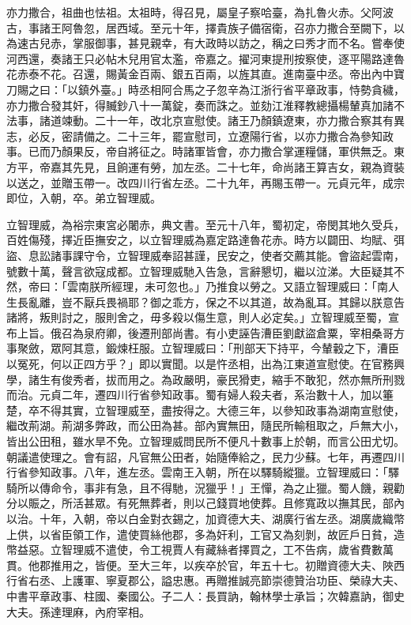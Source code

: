 \begin{pinyinscope}
 亦力撒合，祖曲也怯祖。太祖時，得召見，屬皇子察哈臺，為扎魯火赤。父阿波古，事諸王阿魯忽，居西域。至元十年，擇貴族子備宿衛，召亦力撒合至闕下，以為速古兒赤，掌服御事，甚見親幸，有大政時以訪之，稱之曰秀才而不名。嘗奉使河西還，奏諸王只必帖木兒用官太濫，帝嘉之。擢河東提刑按察使，逐平陽路達魯花赤泰不花。召還，賜黃金百兩、銀五百兩，以旌其直。進南臺中丞。帝出內中寶刀賜之曰：「以鎮外臺。」時丞相阿合馬之子忽辛為江浙行省平章政事，恃勢貪穢，亦力撒合發其奸，得贓鈔八十一萬錠，奏而誅之。並劾江淮釋教總攝楊輦真加諸不法事，諸道竦動。二十一年，改北京宣慰使。諸王乃顏鎮遼東，亦力撒合察其有異志，必反，密請備之。二十三年，罷宣慰司，立遼陽行省，以亦力撒合為參知政事。已而乃顏果反，帝自將征之。時諸軍皆會，亦力撒合掌運糧儲，軍供無乏。東方平，帝嘉其先見，且餉運有勞，加左丞。二十七年，命尚諸王算吉女，親為資裝以送之，並贈玉帶一。改四川行省左丞。二十九年，再賜玉帶一。元貞元年，成宗即位，入朝，卒。弟立智理威。



 立智理威，為裕宗東宮必闍赤，典文書。至元十八年，蜀初定，帝閔其地久受兵，百姓傷殘，擇近臣撫安之，以立智理威為嘉定路達魯花赤。時方以闢田、均賦、弭盜、息訟諸事課守令，立智理威奉詔甚謹，民安之，使者交薦其能。會盜起雲南，號數十萬，聲言欲寇成都。立智理威馳入告急，言辭懇切，繼以泣涕。大臣疑其不然，帝曰：「雲南朕所經理，未可忽也。」乃推食以勞之。又語立智理威曰：「南人生長亂離，豈不厭兵畏禍耶？御之乖方，保之不以其道，故為亂耳。其歸以朕意告諸將，叛則討之，服則舍之，毋多殺以傷生意，則人必定矣。」立智理威至蜀，宣布上旨。俄召為泉府卿，後遷刑部尚書。有小吏誣告漕臣劉獻盜倉粟，宰相桑哥方事聚斂，眾阿其意，鍛煉枉服。立智理威曰：「刑部天下持平，今輦轂之下，漕臣以冤死，何以正四方乎？」即以實聞。以是忤丞相，出為江東道宣慰使。在官務興學，諸生有俊秀者，拔而用之。為政嚴明，豪民猾吏，縮手不敢犯，然亦無所刑戮而治。元貞二年，遷四川行省參知政事。蜀有婦人殺夫者，系治數十人，加以箠楚，卒不得其實，立智理威至，盡按得之。大德三年，以參知政事為湖南宣慰使，繼改荊湖。荊湖多弊政，而公田為甚。部內實無田，隨民所輸租取之，戶無大小，皆出公田租，雖水旱不免。立智理威問民所不便凡十數事上於朝，而言公田尤切。朝議遣使理之。會有詔，凡官無公田者，始隨俸給之，民力少蘇。七年，再遷四川行省參知政事。八年，進左丞。雲南王入朝，所在以驛騎縱獵。立智理威曰：「驛騎所以傳命令，事非有急，且不得馳，況獵乎！」王憚，為之止獵。蜀人饑，親勸分以賑之，所活甚眾。有死無葬者，則以己錢買地使葬。且修寬政以撫其民，部內以治。十年，入朝，帝以白金對衣錫之，加資德大夫、湖廣行省左丞。湖廣歲織幣上供，以省臣領工作，遣使買絲他郡，多為奸利，工官又為刻剝，故匠戶日貧，造幣益惡。立智理威不遣使，令工視賈人有藏絲者擇買之，工不告病，歲省費數萬貫。他郡推用之，皆便。至大三年，以疾卒於官，年五十七。初贈資德大夫、陜西行省右丞、上護軍、寧夏郡公，謚忠惠。再贈推誠亮節崇德贊治功臣、榮祿大夫、中書平章政事、柱國、秦國公。子二人：長買訥，翰林學士承旨；次韓嘉訥，御史大夫。孫達理麻，內府宰相。




\end{pinyinscope}
